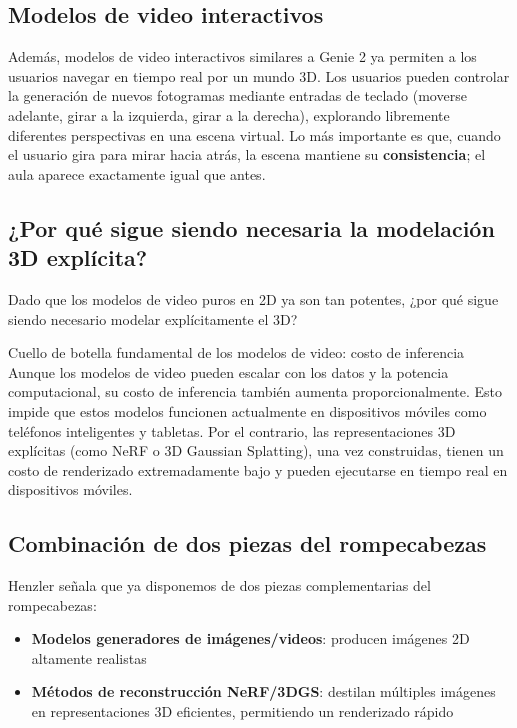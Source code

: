 \subsection{Modelos de video interactivos}

Además, modelos de video interactivos similares a Genie 2 ya permiten a los usuarios navegar en tiempo real por un mundo 3D. Los usuarios pueden controlar la generación de nuevos fotogramas mediante entradas de teclado (moverse adelante, girar a la izquierda, girar a la derecha), explorando libremente diferentes perspectivas en una escena virtual. Lo más importante es que, cuando el usuario gira para mirar hacia atrás, la escena mantiene su \textbf{consistencia}; el aula aparece exactamente igual que antes.

\subsection{¿Por qué sigue siendo necesaria la modelación 3D explícita?}

Dado que los modelos de video puros en 2D ya son tan potentes, ¿por qué sigue siendo necesario modelar explícitamente el 3D?

\begin{warningbox}{Cuello de botella fundamental de los modelos de video: costo de inferencia}
Aunque los modelos de video pueden escalar con los datos y la potencia computacional, su costo de inferencia también aumenta proporcionalmente. Esto impide que estos modelos funcionen actualmente en dispositivos móviles como teléfonos inteligentes y tabletas. Por el contrario, las representaciones 3D explícitas (como NeRF o 3D Gaussian Splatting), una vez construidas, tienen un costo de renderizado extremadamente bajo y pueden ejecutarse en tiempo real en dispositivos móviles.
\end{warningbox}

\subsection{Combinación de dos piezas del rompecabezas}

Henzler señala que ya disponemos de dos piezas complementarias del rompecabezas:

\begin{itemize}
    \item \textbf{Modelos generadores de imágenes/videos}: producen imágenes 2D altamente realistas
    \item \textbf{Métodos de reconstrucción NeRF/3DGS}: destilan múltiples imágenes en representaciones 3D eficientes, permitiendo un renderizado rápido
\end{itemize}

